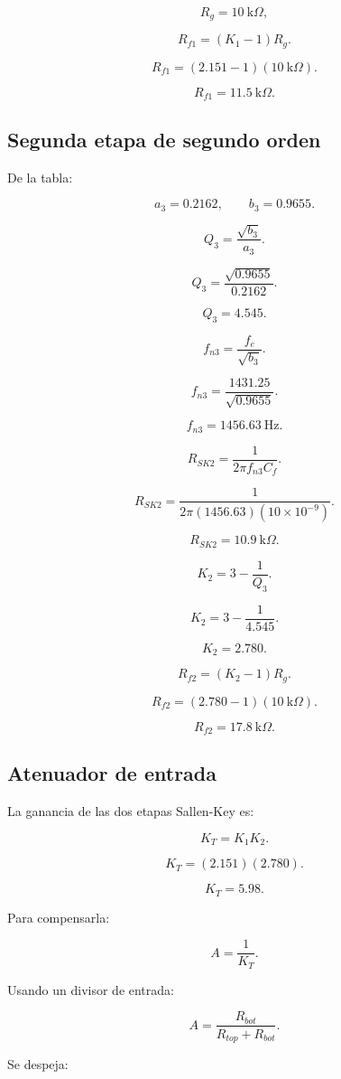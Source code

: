 \documentclass[11pt,letterpaper]{article}
\begin{document}
\[
R_g=10~\text{k}\Omega,
\]

\[
R_{f1}=(K_1-1)R_g.
\]

\[
R_{f1}=(2.151-1)(10~\text{k}\Omega).
\]

\[
R_{f1}=11.5~\text{k}\Omega.
\]

\subsection{Segunda etapa de segundo orden}

De la tabla:

\[
a_3=0.2162,
\qquad
b_3=0.9655.
\]

\[
Q_3=\frac{\sqrt{b_3}}{a_3}.
\]

\[
Q_3=\frac{\sqrt{0.9655}}{0.2162}.
\]

\[
Q_3=4.545.
\]

\[
f_{n3}=\frac{f_c}{\sqrt{b_3}}.
\]

\[
f_{n3}=\frac{1431.25}{\sqrt{0.9655}}.
\]

\[
f_{n3}=1456.63~\text{Hz}.
\]

\[
R_{SK2}=\frac{1}{2\pi f_{n3}C_f}.
\]

\[
R_{SK2}=
\frac{1}{2\pi(1456.63)(10\times10^{-9})}.
\]

\[
R_{SK2}=10.9~\text{k}\Omega.
\]

\[
K_2=3-\frac{1}{Q_3}.
\]

\[
K_2=3-\frac{1}{4.545}.
\]

\[
K_2=2.780.
\]

\[
R_{f2}=(K_2-1)R_g.
\]

\[
R_{f2}=(2.780-1)(10~\text{k}\Omega).
\]

\[
R_{f2}=17.8~\text{k}\Omega.
\]

\subsection{Atenuador de entrada}

La ganancia de las dos etapas Sallen-Key es:

\[
K_T=K_1K_2.
\]

\[
K_T=(2.151)(2.780).
\]

\[
K_T=5.98.
\]

Para compensarla:

\[
A=\frac{1}{K_T}.
\]

Usando un divisor de entrada:

\[
A=\frac{R_{bot}}{R_{top}+R_{bot}}.
\]

Se despeja:
\end{document}
